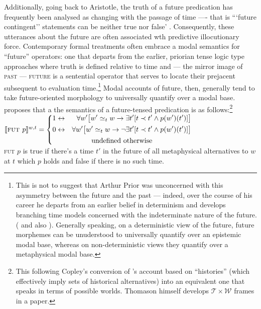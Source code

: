 Additionally, going back to Aristotle, the truth of a future predication has frequently been analysed as changing with the passage of time ---- that is ```future contingent'' statements can be neither true nor false' \citep[265]{Thomason1970}. Consequently, these utterances about the future are often associated wth predictive illocutionary force. Contemporary formal treatments often embrace a modal semantics for ``future'' operators: one that departs from the earlier, priorian tense logic type approaches where truth is defined relative to time and --- the mirror image of \textsc{past} --- \textsc{future} is a sentential operator that serves to locate their prejacent subsequent to evaluation time.\footnote{This is not to suggest that Arthur Prior was unconcerned with this asymmetry between the future and the past --- indeed, over the course of his career he departs from an earlier belief in determinism and develops branching time models concerned with the indeterminate nature of the future. (\citealp[see][]{Copeland2020} and also \citealp[13]{Copley2009}). Generally speaking, on a deterministic view of the future, future morphemes can be unuderstood to universally quantify over an epistemic modal base, whereas on non-deterministic views they quantify over a metaphysical modal base.} Modal accounts of future, then, generally tend to take future-oriented morphology to universally quantify over a modal base. \citet[274]{Thomason1970} proposes that a the semantics of a future-tensed predication is as follows:\footnote{This following Copley's \citeyearpar[14]{Copley2009} conversion of \citeauthor{Thomason1970}'s account based on ``histories'' (which effectively imply sets of historical alternatives) into an equivalent one that speaks in terms of possible worlds. Thomason himself develops $ \mathcal{T\times W} $ frames in a \citeyear{Thomason1984} paper.}
\pex $ \denote[w,t]{\textsc{fut }p}=\left\{\begin{gathered}\begin{aligned} 1&\leftrightarrow &\forall w'\big[w'\simeq_t w \to \exists t' [t\prec t' \wedge p(w')(t')]\big]\\
0&\leftrightarrow &\forall w'\big[w'\simeq_t w \to \neg\exists t' [t\prec t' \wedge p(w')(t')]\big]
\end{aligned}\\
\text{undefined otherwise}\end{gathered}\right.
$\\[.5em]
\textsc{fut} $p$ is true if there's a time $ t' $ in the future of all metaphysical alternatives to $ w $ at $ t $ which $ p $ holds and false if there is no such time.\xe

